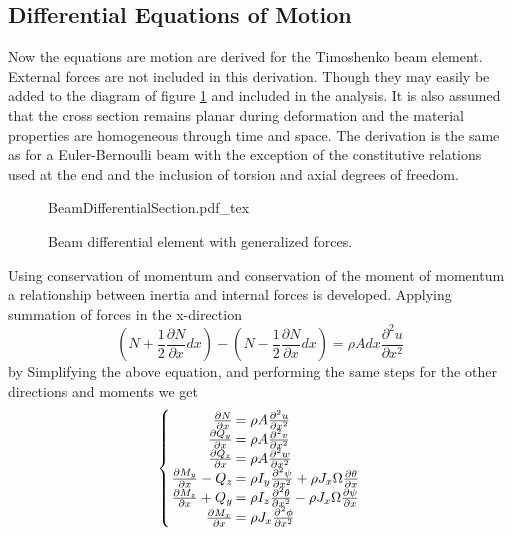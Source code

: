 \subsection{Differential Equations of Motion} \label{Differential Equations of Motion}
Now the equations are motion are derived for the Timoshenko beam element. External forces are not included in this derivation. Though they may easily be added to the diagram of figure \ref{fig:BeamDifferentialSection} and included in the analysis. It is also assumed that the cross section remains planar during deformation and the material properties are homogeneous through time and space. The derivation is the same as for a Euler-Bernoulli beam with the exception of the constitutive relations used at the end and the inclusion of torsion and axial degrees of freedom.
\begin{figure}
	\centering
	\def\svgwidth{600pt}
	{BeamDifferentialSection.pdf_tex}
	\caption{Beam differential element with generalized forces.}
	\label{fig:BeamDifferentialSection}
\end{figure}
Using conservation of momentum and conservation of the moment of momentum a relationship between inertia and internal forces is developed. Applying summation of forces in the x-direction
\begin{equation}\label{key}
(N+\frac{1}{2}\frac{\partial N}{\partial x}dx)-(N-\frac{1}{2}\frac{\partial N}{\partial x}dx)=\rho A dx \frac{\partial^2u}{\partial x^2}
\end{equation}
by Simplifying the above equation, and performing the same steps for the other directions and moments we get
\begin{equation}\label{eq:EquilibriumEquations}
\left\{\arraycolsep=1pt\begin{array}{rl}
\frac{\partial N}{\partial x}&=\rho A\frac{\partial^2 u}{\partial x^2}\\
\frac{\partial Q_y}{\partial x}&=\rho A\frac{\partial^2 v}{\partial x^2}\\
\frac{\partial Q_z}{\partial x}&=\rho A\frac{\partial^2 w}{\partial x^2}\\
\frac{\partial M_y}{\partial x}-Q_z&=\rho I_y \frac{\partial^2\psi}{\partial x^2} + \rho J_x\Omega\frac{\partial\theta}{\partial x}\\
\frac{\partial M_z}{\partial x}+Q_y&=\rho I_z \frac{\partial^2\theta}{\partial x^2} - \rho J_x\Omega\frac{\partial\psi}{\partial x}\\
\frac{\partial M_x}{\partial x}&=\rho J_x\frac{\partial^2\phi}{\partial x^2}
\end{array}\right.
\end{equation}
